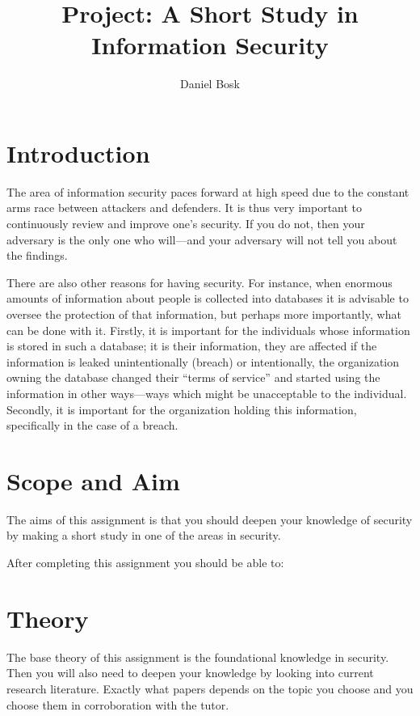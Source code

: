 \documentclass[a4paper]{article}
\title{Project: A Short Study in Information Security}
\author{%
  Daniel Bosk
}
\institute{%
  Department of Information and Communication Systems\\
  Mid Sweden University, Sundsvall
}
\begin{document}
\maketitle


\section{Introduction}%
\label{sec:intro}

The area of information security paces forward at high speed due to the 
constant arms race between attackers and defenders.
It is thus very important to continuously review and improve one's security.
If you do not, then your adversary is the only one who will---and your 
adversary will not tell you about the findings.

There are also other reasons for having security.
For instance, when enormous amounts of information about people is collected 
into databases it is advisable to oversee the protection of that information, 
but perhaps more importantly, what can be done with it.
Firstly, it is important for the individuals whose information is stored in such 
a database; it is their information, they are affected if the information is 
leaked unintentionally (breach) or intentionally, \eg the organization owning 
the database changed their \enquote{terms of service} and started using the 
information in other ways---ways which might be unacceptable to the individual.
Secondly, it is important for the organization holding this information, 
specifically in the case of a breach.


\section{Scope and Aim}%
\label{sec:goal}

The aims of this assignment is that you should deepen your knowledge of 
security by making a short study in one of the areas in security.

After completing this assignment you should be able to:
\begin{itemize}
	
\end{itemize}


\section{Theory}

The base theory of this assignment is the foundational knowledge in security.
Then you will also need to deepen your knowledge by looking into current 
research literature.
Exactly what papers depends on the topic you choose and you choose them in 
corroboration with the tutor.
\end{document}
